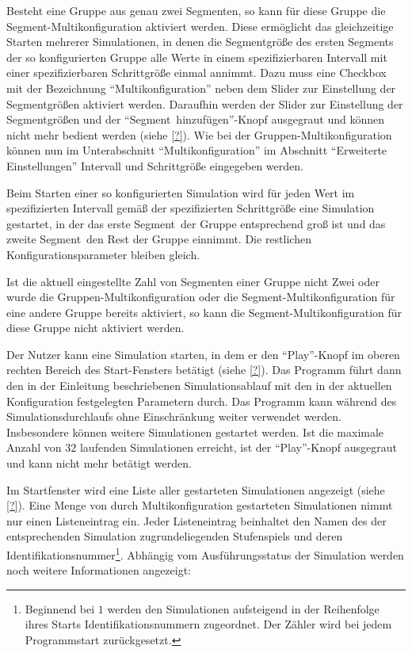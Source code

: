 \documentclass[parskip=full,11pt]{scrartcl}
\def\segment{Segment}
\def\segments{Segmente}
\begin{document}
\functionality{Multikonfiguration von \segments n}{fnc:multikonfseg}
Besteht eine Gruppe aus genau zwei \segments n, so kann für diese Gruppe die \segment -Multikonfiguration aktiviert werden. Diese ermöglicht das gleichzeitige Starten mehrerer Simulationen, in denen die \segment größe des ersten \segment s der so konfigurierten Gruppe alle Werte in einem spezifizierbaren Intervall mit einer spezifizierbaren Schrittgröße einmal annimmt. Dazu muss eine Checkbox mit der Bezeichnung \enquote{Multikonfiguration} neben dem Slider zur Einstellung der \segment größen aktiviert werden. Daraufhin werden der Slider zur Einstellung der \segment größen und der \enquote{\segment\ hinzufügen}-Knopf ausgegraut und können nicht mehr bedient werden (siehe \cref{?}). Wie bei der Gruppen-Multikonfiguration können nun im Unterabschnitt \enquote{Multikonfiguration} im Abschnitt \enquote{Erweiterte Einstellungen} Intervall und Schrittgröße eingegeben werden.

Beim Starten einer so konfigurierten Simulation wird für jeden Wert im spezifizierten Intervall gemäß der spezifizierten Schrittgröße eine Simulation gestartet, in der das erste \segment\ der Gruppe entsprechend groß ist und das zweite \segment\ den Rest der Gruppe einnimmt. Die restlichen Konfigurationsparameter bleiben gleich.

Ist die aktuell eingestellte Zahl von \segments n einer Gruppe nicht Zwei oder wurde die Gruppen-Multikonfiguration oder die \segment -Multikonfiguration für eine andere Gruppe bereits aktiviert, so kann die \segment -Multikonfiguration für diese Gruppe nicht aktiviert werden.

Der Nutzer kann eine Simulation starten, in dem er den \enquote{Play}-Knopf im oberen rechten Bereich des Start-Fensters betätigt (siehe \cref{?}). Das Programm führt dann den in der Einleitung beschriebenen Simulationsablauf mit den in der aktuellen Konfiguration festgelegten Parametern durch. Das Programm kann während des Simulationsdurchlaufs ohne Einschränkung weiter verwendet werden. Insbesondere können weitere Simulationen gestartet werden. Ist die maximale Anzahl von \(32\) laufenden Simulationen erreicht, ist der \enquote{Play}-Knopf ausgegraut und kann nicht mehr betätigt werden.

Im Startfenster wird eine Liste aller gestarteten Simulationen angezeigt (siehe \cref{?}). Eine Menge von durch Multikonfiguration gestarteten Simulationen nimmt nur einen Listeneintrag ein. Jeder Listeneintrag beinhaltet den Namen des der entsprechenden Simulation zugrundeliegenden Stufenspiels und deren Identifikationsnummer\footnote{Beginnend bei \(1\) werden den Simulationen aufsteigend in der Reihenfolge ihres Starts Identifikationsnummern zugeordnet. Der Zähler wird bei jedem Programmstart zurückgesetzt.}. Abhängig vom Ausführungsstatus der Simulation werden noch weitere Informationen angezeigt:
\end{document}
